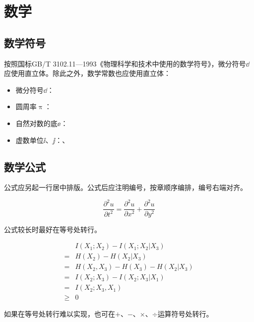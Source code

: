 \section{数学}\label{sec:math}

\subsection{数学符号}

按照国标GB/T 3102.11—1993《物理科学和技术中使用的数学符号》，微分符号$\dd$应使用直立体。除此之外，数学常数也应使用直立体：

\begin{itemize}
    \item 微分符号$\dd$：
    \item 圆周率$\uppi$：
    \item 自然对数的底$\ee$：
    \item 虚数单位$\ii$、$\jj$：、
\end{itemize}

\subsection{数学公式}

公式应另起一行居中排版。公式后应注明编号，按章顺序编排，编号右端对齐。

\begin{equation}
    \frac{\partial^2u}{\partial t^2}=\frac{\partial^2u}{\partial x^2}+\frac{\partial^2u}{\partial y^2}
\end{equation}

公式较长时最好在等号处转行。

\begin{align}
         & I(X_1;X_2)-I(X_1;X_2|X_3) \nonumber    \\
    =    & H(X_2)-H(X_2|X_3) \nonumber            \\
    =    & H(X_2,X_3)-H(X_3)-H(X_2|X_3) \nonumber \\
    =    & I(X_2;X_3)-I(X_2;X_3|X_1) \nonumber    \\
    =    & I(X_2;X_3,X_1) \nonumber               \\
    \geq & 0
\end{align}

如果在等号处转行难以实现，也可在$+$、$-$、$\times$、$\div$运算符号处转行。

